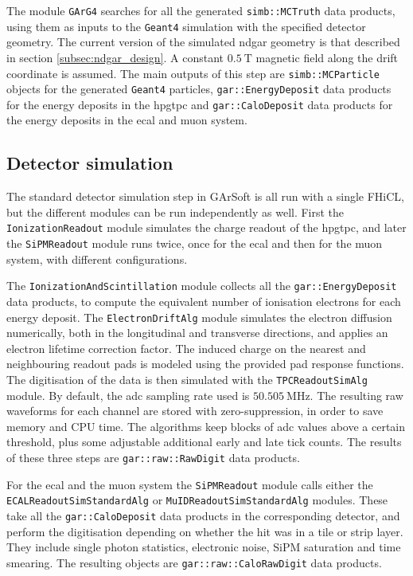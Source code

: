 The module \texttt{GArG4} searches for all the generated \texttt{simb::MCTruth} data products, using them as inputs to the \texttt{Geant4} simulation with the specified detector geometry. The current version of the simulated \gls{ndgar} geometry is that described in section \ref{subsec:ndgar_design}. A constant $0.5~\mathrm{T}$ magnetic field along the drift coordinate is assumed. The main outputs of this step are \texttt{simb::MCParticle} objects for the generated \texttt{Geant4} particles, \texttt{gar::EnergyDeposit} data products for the energy deposits in the \gls{hpgtpc} and \texttt{gar::CaloDeposit} data products for the energy deposits in the \gls{ecal} and muon system.

\subsection{Detector simulation}

The standard detector simulation step in GArSoft is all run with a single FHiCL, but the different modules can be run independently as well. First the \texttt{IonizationReadout} module simulates the charge readout of the \gls{hpgtpc}, and later the \texttt{SiPMReadout} module runs twice, once for the \gls{ecal} and then for the muon system, with different configurations.

The \texttt{IonizationAndScintillation} module collects all the \texttt{gar::EnergyDeposit} data products, to compute the equivalent number of ionisation electrons for each energy deposit. The \texttt{ElectronDriftAlg} module simulates the electron diffusion numerically, both in the longitudinal and transverse directions, and applies an electron lifetime correction factor. The induced charge on the nearest and neighbouring readout pads is modeled using the provided pad response functions. The digitisation of the data is then simulated with the \texttt{TPCReadoutSimAlg} module. By default, the \gls{adc} sampling rate used is $50.505~\mathrm{MHz}$. The resulting raw waveforms for each channel are stored with zero-suppression, in order to save memory and CPU time. The algorithms keep blocks of \gls{adc} values above a certain threshold, plus some adjustable additional early and late tick counts. The results of these three steps are \texttt{gar::raw::RawDigit} data products.

For the \gls{ecal} and the muon system the \texttt{SiPMReadout} module calls either the \texttt{ECALReadoutSimStandardAlg} or \texttt{MuIDReadoutSimStandardAlg} modules. These take all the \texttt{gar::CaloDeposit} data products in the corresponding detector, and perform the digitisation depending on whether the hit was in a tile or strip layer. They include single photon statistics, electronic noise, SiPM saturation and time smearing. The resulting objects are \texttt{gar::raw::CaloRawDigit} data products.

